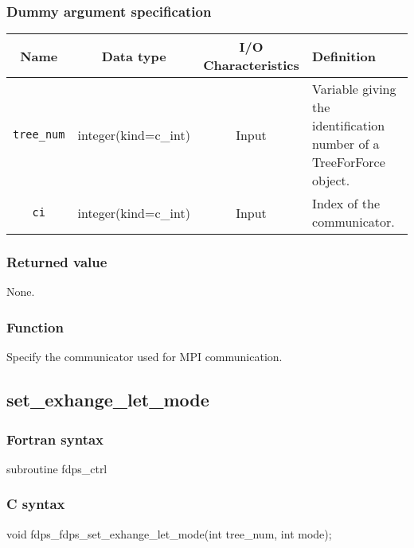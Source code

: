 \subsubsection*{Dummy argument specification}
\begin{table}[h]
\begin{tabularx}{\linewidth}{cccX}
\toprule
\rowcolor{Snow2}
Name & Data type & I/O Characteristics & Definition \\
\midrule
\texttt{tree\_num} & integer(kind=c\_int) & Input &  Variable giving the identification number of a TreeForForce object.\\
\texttt{ci} & integer(kind=c\_int) & Input & Index of the communicator.\\
\bottomrule
\end{tabularx}
\end{table}

\subsubsection*{Returned value}
None.

\subsubsection*{Function}

Specify the communicator used for MPI communication.

\subsection{set\_exhange\_let\_mode}
\subsubsection*{Fortran syntax}
\begin{screen}
\begin{spverbatim}
subroutine fdps_ctrl%
\end{spverbatim}
\end{screen}

\subsubsection*{C syntax}
\begin{screen}
\begin{spverbatim}
void fdps_fdps_set_exhange_let_mode(int tree_num,
                                   int mode);
\end{spverbatim}
\end{screen}



